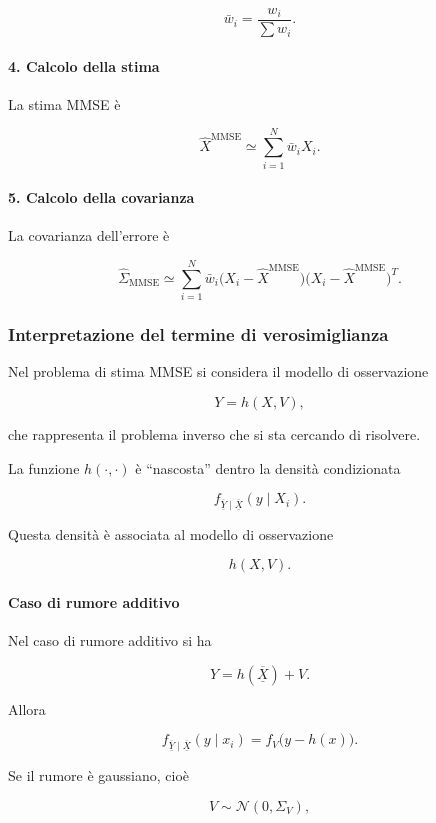 \documentclass[11pt,a4paper]{article}
\begin{document}
\[
\bar w_i
=
\frac{w_i}{\displaystyle\sum w_i}.
\]

\paragraph{4. Calcolo della stima}

La stima MMSE è

\[
\hat X^{\mathrm{MMSE}}
\simeq
\sum_{i=1}^{N}\bar w_i X_i.
\]

\paragraph{5. Calcolo della covarianza}

La covarianza dell'errore è

\[
\hat\Sigma_{\mathrm{MMSE}}
\simeq
\sum_{i=1}^{N}
\bar w_i
\bigl(X_i-\hat X^{\mathrm{MMSE}}\bigr)
\bigl(X_i-\hat X^{\mathrm{MMSE}}\bigr)^T.
\]


\subsubsection*{Interpretazione del termine di verosimiglianza}

Nel problema di stima MMSE si considera il modello di osservazione

\[
Y=h(X,V),
\]

che rappresenta il problema inverso che si sta cercando di risolvere.

La funzione \(h(\cdot,\cdot)\) è ``nascosta'' dentro la densità condizionata

\[
f_{\overline{\underline{Y}}\mid \overline{\underline{X}}}(y\mid X_i).
\]

Questa densità è associata al modello di osservazione

\[
h(X,V).
\]

\paragraph{Caso di rumore additivo}

Nel caso di rumore additivo si ha

\[
Y=h(\overline{\underline{X}})+V.
\]

Allora

\[
f_{\overline{\underline{Y}}\mid \overline{\underline{X}}}(y\mid x_i)
=
f_V\bigl(y-h(x)\bigr).
\]

Se il rumore è gaussiano, cioè

\[
V\sim \mathcal{N}(0,\Sigma_V),
\]
\end{document}
